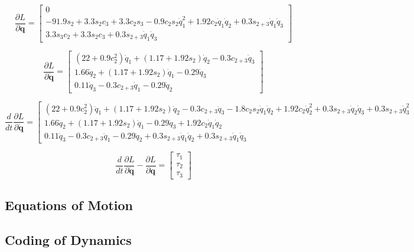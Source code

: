 $$
\frac{\partial L}{\partial \boldsymbol{q}}=\left[\begin{array}{c}
0 \\
-91.9 s_{2}+3.3 s_{2} c_{3}+3.3 c_{2} s_{3}-0.9 c_{2} s_{2} \dot{q}_{1}^{2}+1.92 c_{2} \dot{q}_{1} \dot{q}_{2}+0.3 s_{2+3} \dot{q}_{1} \dot{q}_{3} \\
3.3 s_{3} c_{2}+3.3 s_{2} c_{3}+0.3 s_{2+3} \dot{q}_{1} \dot{q}_{3}
\end{array}\right]
$$


$$
\frac{\partial L}{\partial \dot{\boldsymbol{q}}}=\left[\begin{array}{c}
\left(22+0.9 c_{2}^{2}\right) \dot{q}_{1}+\left(1.17+1.92 s_{2}\right) \dot{q}_{2}-0.3 c_{2+3} \dot{q}_{3} \\
1.66 \dot{q}_{2}+\left(1.17+1.92 s_{2}\right) \dot{q}_{1}-0.29 \dot{q}_{3} \\
0.11 \dot{q}_{3}-0.3 c_{2+3} \dot{q}_{1}-0.29 \dot{q}_{2}
\end{array}\right]
$$



$$
\frac{d}{d t} \frac{\partial L}{\partial \dot{\boldsymbol{q}}}
=\left[\begin{array}{c}
\left(22+0.9 c_{2}^{2}\right) \ddot{q}_{1}+\left(1.17+1.92 s_{2}\right) \ddot{q}_{2}-0.3 c_{2+3} \ddot{q}_{3}-1.8 c_{2} s_{2} \dot{q}_{1} \dot{q}_{2}+1.92 c_{2} \dot{q}_{2}^{2}+0.3 s_{2+3} \dot{q}_{2} \dot{q}_{3}+0.3 s_{2+3} \dot{q}_{3}^{2} \\
1.66 \ddot{q}_{2}+\left(1.17+1.92 s_{2}\right) \ddot{q}_{1}-0.29 \ddot{q}_{3}+1.92 c_{2} \dot{q}_{1} \dot{q}_{2} \\
0.11 \ddot{q}_{3}-0.3 c_{2+3} \ddot{q}_{1}-0.29 \ddot{q}_{2}+0.3 s_{2+3} \dot{q}_{1} \dot{q}_{2}+0.3 s_{2+3} \dot{q}_{1} \dot{q}_{3}
\end{array}\right.
$$

$$
\frac{d}{d t} \frac{\partial L}{\partial \dot{\boldsymbol{q}}}-\frac{\partial L}{\partial \boldsymbol{q}}=\left[\begin{array}{l}
\tau_{1} \\
\tau_{2} \\
\tau_{3}
\end{array}\right]
$$

\subsection*{Equations of Motion}

\subsection*{Coding of Dynamics }
